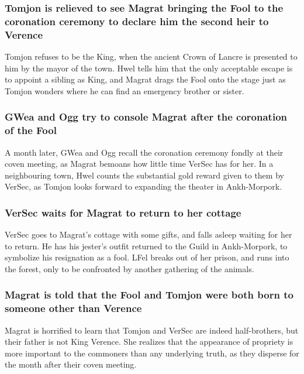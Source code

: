 \subsubsection{\Gls{Tomjon} is relieved to see \Gls{Magrat} bringing the \Gls{Fool} to the
    coronation ceremony to declare him the second heir to \Gls{Verence}}
\Gls{Tomjon} refuses to be the King, when the ancient Crown of Lancre is presented to him by the
mayor of the town. \Gls{Hwel} tells him that the only acceptable escape is to appoint a sibling as
King, and \Gls{Magrat} drags the \Gls{Fool} onto the stage just as \Gls{Tomjon} wonders where he
can find an emergency brother or sister.

\subsubsection{\Gls{GWea} and \Gls{Ogg} try to console \Gls{Magrat} after the coronation of the
    \Gls{Fool}}
A month later, \Gls{GWea} and \Gls{Ogg} recall the coronation ceremony fondly at their coven
meeting, as \Gls{Magrat} bemoans how little time \Gls{VerSec} has for her. In a neighbouring town,
\Gls{Hwel} counts the substantial gold reward given to them by \Gls{VerSec}, as \Gls{Tomjon} looks
forward to expanding the theater in Ankh-Morpork.

\subsubsection{\Gls{VerSec} waits for \Gls{Magrat} to return to her cottage}
\Gls{VerSec} goes to \Gls{Magrat}'s cottage with some gifts, and falls asleep waiting for her to
return. He has his jester's outfit returned to the Guild in Ankh-Morpork, to symbolize his
resignation as a fool. \Gls{LFel} breaks out of her prison, and runs into the forest, only to be
confronted by another gathering of the animals.

\subsubsection{\Gls{Magrat} is told that the \Gls{Fool} and \Gls{Tomjon} were both born to someone
    other than \Gls{Verence}}
\Gls{Magrat} is horrified to learn that \Gls{Tomjon} and \Gls{VerSec} are indeed half-brothers, but
their father is not King \Gls{Verence}. She realizes that the appearance of propriety is more
important to the commoners than any underlying truth, as they disperse for the month after their
coven meeting.